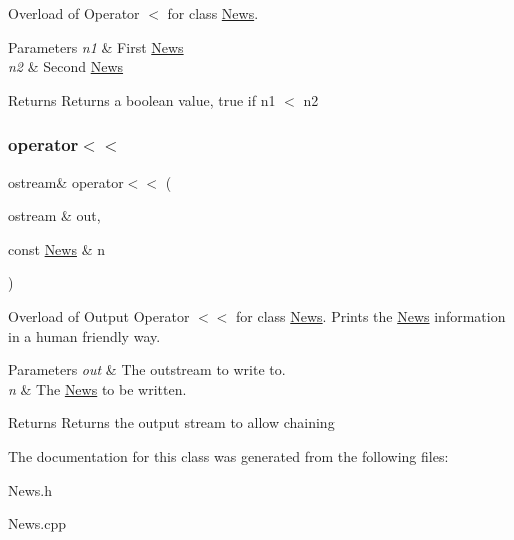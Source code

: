 Overload of Operator $<$ for class \hyperlink{class_news}{News}. 
\begin{DoxyParams}{Parameters}
{\em n1} & First \hyperlink{class_news}{News} \\
\hline
{\em n2} & Second \hyperlink{class_news}{News} \\
\hline
\end{DoxyParams}
\begin{DoxyReturn}{Returns}
Returns a boolean value, true if n1 $<$ n2 
\end{DoxyReturn}
\hypertarget{class_news_a9440c22f12d6ed3e7c1026dd53e8da61}{}\label{class_news_a9440c22f12d6ed3e7c1026dd53e8da61} 
\subsubsection{\texorpdfstring{operator$<$$<$}{operator<<}}
{\footnotesize\ttfamily ostream\& operator$<$$<$ (\begin{DoxyParamCaption}\item[{ostream \&}]{out,  }\item[{const \hyperlink{class_news}{News} \&}]{n }\end{DoxyParamCaption})\hspace{0.3cm}{\ttfamily [friend]}}

Overload of Output Operator $<$$<$ for class \hyperlink{class_news}{News}. Prints the \hyperlink{class_news}{News}\textquotesingle{} information in a human friendly way. 
\begin{DoxyParams}{Parameters}
{\em out} & The outstream to write to. \\
\hline
{\em n} & The \hyperlink{class_news}{News} to be written. \\
\hline
\end{DoxyParams}
\begin{DoxyReturn}{Returns}
Returns the output stream to allow chaining 
\end{DoxyReturn}


The documentation for this class was generated from the following files\+:\begin{DoxyCompactItemize}
\item 
News.\+h\item 
News.\+cpp\end{DoxyCompactItemize}
